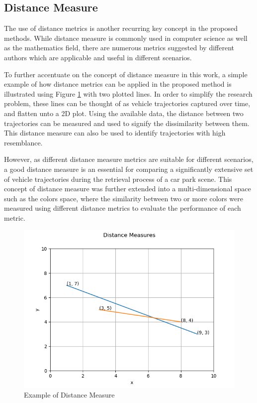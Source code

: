 \subsection{Distance Measure}
\label{section:distancemeasures}

The use of distance metrics is another recurring key concept in the proposed methods. While distance measure is commonly used in computer science as well as the mathematics field, there are numerous metrics suggested by different authors which are applicable and useful in different scenarios. 

To further accentuate on the concept of distance measure in this work, a simple example of how distance metrics can be applied in the proposed method is illustrated using Figure \ref{fig:distanceMeasure} with two plotted lines. In order to simplify the research problem, these lines can be thought of as vehicle trajectories captured over time, and flatten unto a 2D plot. Using the available data, the distance between two trajectories can be measured and used to signify the dissimilarity between them. This distance measure can also be used to identify trajectories with high resemblance. 

However, as different distance measure metrics are suitable for different scenarios, a good distance measure is an essential for comparing a significantly extensive set of vehicle trajectories during the retrieval process of a car park scene. This concept of distance measure was further extended into a multi-dimensional space such as the colors space, where the similarity between two or more colors were measured using different distance metrics to evaluate the performance of each metric. 


\begin{figure}[hbt!]\centering
\includegraphics[width=.7\textwidth]{image/general/distance.png}
\caption{Example of Distance Measure}
\label{fig:distanceMeasure}
\end{figure}






